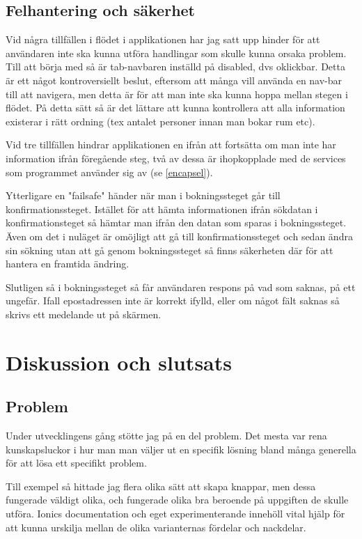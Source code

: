 \documentclass[a4paper]{article}
\begin{document}
\subsection{Felhantering och säkerhet}
Vid några tillfällen i flödet i applikationen har jag satt upp hinder för att användaren inte ska kunna utföra handlingar som skulle kunna orsaka problem. Till att börja med så är tab-navbaren inställd på disabled, dvs oklickbar. Detta är ett något kontroversiellt beslut, eftersom att många vill använda en nav-bar till att navigera, men detta är för att man inte ska kunna hoppa mellan stegen i flödet. På detta sätt så är det lättare att kunna kontrollera att alla information existerar i rätt ordning (tex antalet personer innan man bokar rum etc).

Vid tre tillfällen hindrar applikationen en ifrån att fortsätta om man inte har information ifrån föregående steg, två av dessa är ihopkopplade med de services som programmet använder sig av (se \ref{encapsel}).

Ytterligare en "failsafe" händer när man i bokningssteget går till konfirmationssteget.  Istället för att hämta informationen ifrån sökdatan i konfirmationsteget så hämtar man ifrån den datan som sparas i bokningssteget. Även om det i nuläget är omöjligt att gå till konfirmationssteget och sedan ändra sin sökning utan att gå genom bokningssteget så finns säkerheten där för att hantera en framtida ändring.\cite{failSafe}

Slutligen så i bokningssteget så får användaren respons på vad som saknas, på ett ungefär. Ifall epostadressen inte är korrekt ifylld, eller om något fält saknas så skrivs ett medelande ut på skärmen.

\section{Diskussion  och slutsats}
\subsection{Problem}
Under utvecklingens gång stötte jag på en del problem. Det mesta var rena kunskapsluckor i hur man man väljer ut en specifik lösning bland många generella för att lösa ett specifikt problem.

Till exempel så hittade jag flera olika sätt att skapa knappar, men dessa fungerade väldigt olika, och fungerade olika bra beroende på uppgiften de skulle utföra. Ionics documentation och eget experimenterande innehöll vital hjälp för att kunna urskilja mellan de olika varianternas fördelar och nackdelar.
\end{document}
